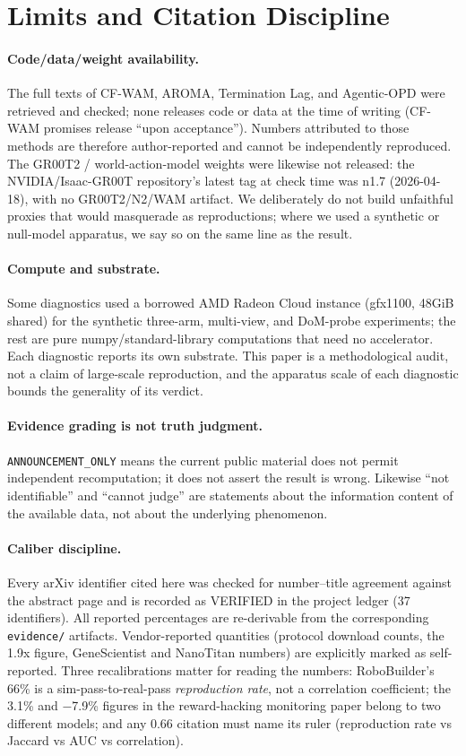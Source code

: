 \section{Limits and Citation Discipline}
\label{sec:limits}

\paragraph{Code/data/weight availability.} The full texts of CF-WAM, AROMA,
Termination Lag, and Agentic-OPD were retrieved and checked; none releases code
or data at the time of writing (CF-WAM promises release ``upon acceptance'').
Numbers attributed to those methods are therefore author-reported and cannot be
independently reproduced. The GR00T2 / world-action-model weights were likewise
not released: the NVIDIA/Isaac-GR00T repository's latest tag at check time was
n1.7 (2026-04-18), with no GR00T2/N2/WAM artifact. We deliberately do not build
unfaithful proxies that would masquerade as reproductions; where we used a
synthetic or null-model apparatus, we say so on the same line as the result.

\paragraph{Compute and substrate.} Some diagnostics used a borrowed AMD Radeon
Cloud instance (gfx1100, 48GiB shared) for the synthetic three-arm, multi-view,
and DoM-probe experiments; the rest are pure numpy/standard-library computations
that need no accelerator. Each diagnostic reports its own substrate. This paper
is a methodological audit, not a claim of large-scale reproduction, and the
apparatus scale of each diagnostic bounds the generality of its verdict.

\paragraph{Evidence grading is not truth judgment.} \texttt{ANNOUNCEMENT\_ONLY}
means the current public material does not permit independent recomputation; it
does not assert the result is wrong. Likewise ``not identifiable'' and
``cannot judge'' are statements about the information content of the available
data, not about the underlying phenomenon.

\paragraph{Caliber discipline.} Every arXiv identifier cited here was checked for
number--title agreement against the abstract page and is recorded as VERIFIED in
the project ledger (37 identifiers). All reported percentages are re-derivable
from the corresponding \texttt{evidence/} artifacts. Vendor-reported quantities
(protocol download counts, the 1.9x figure, GeneScientist and NanoTitan numbers)
are explicitly marked as self-reported. Three recalibrations matter for reading
the numbers: RoboBuilder's 66\% is a sim-pass-to-real-pass \emph{reproduction
rate}, not a correlation coefficient; the 3.1\% and $-$7.9\% figures in the
reward-hacking monitoring paper belong to two different models; and any 0.66
citation must name its ruler (reproduction rate vs Jaccard vs AUC vs
correlation).

